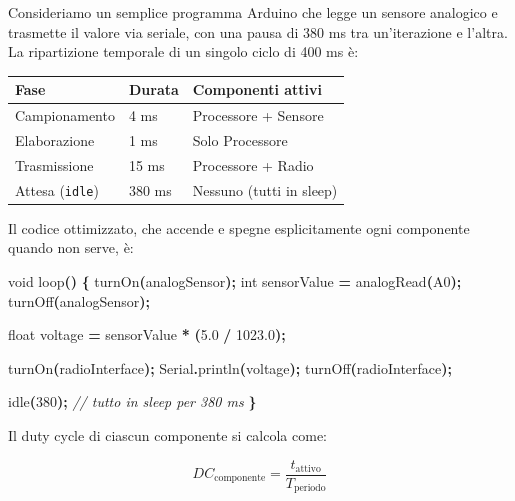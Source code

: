 \documentclass[
  italian,
  openany]{book}
\newenvironment{Shaded}{\begin{snugshade}}{\end{snugshade}}
\newcommand{\CommentTok}[1]{\textcolor[rgb]{0.56,0.35,0.01}{\textit{#1}}}
\newcommand{\DataTypeTok}[1]{\textcolor[rgb]{0.13,0.29,0.53}{#1}}
\newcommand{\DecValTok}[1]{\textcolor[rgb]{0.00,0.00,0.81}{#1}}
\newcommand{\FloatTok}[1]{\textcolor[rgb]{0.00,0.00,0.81}{#1}}
\newcommand{\NormalTok}[1]{#1}
\newcommand{\OperatorTok}[1]{\textcolor[rgb]{0.81,0.36,0.00}{\textbf{#1}}}
\newcounter{none} %
\begin{document}
Consideriamo un semplice programma Arduino che legge un sensore
analogico e trasmette il valore via seriale, con una pausa di 380 ms tra
un'iterazione e l'altra. La ripartizione temporale di un singolo ciclo
di 400 ms è:

{\def\LTcaptype{none} %
\begin{longtable}[]{@{}lll@{}}
\toprule\noalign{}
Fase & Durata & Componenti attivi \\
\midrule\noalign{}
\endhead
\bottomrule\noalign{}
\endlastfoot
Campionamento & 4 ms & Processore + Sensore \\
Elaborazione & 1 ms & Solo Processore \\
Trasmissione & 15 ms & Processore + Radio \\
Attesa (\texttt{idle}) & 380 ms & Nessuno (tutti in sleep) \\
\end{longtable}
}

Il codice ottimizzato, che accende e spegne esplicitamente ogni
componente quando non serve, è:

\begin{Shaded}
\begin{Highlighting}[]
\DataTypeTok{void}\NormalTok{ loop}\OperatorTok{()} \OperatorTok{\{}
\NormalTok{    turnOn}\OperatorTok{(}\NormalTok{analogSensor}\OperatorTok{);}
    \DataTypeTok{int}\NormalTok{ sensorValue }\OperatorTok{=}\NormalTok{ analogRead}\OperatorTok{(}\NormalTok{A0}\OperatorTok{);}
\NormalTok{    turnOff}\OperatorTok{(}\NormalTok{analogSensor}\OperatorTok{);}
    
    \DataTypeTok{float}\NormalTok{ voltage }\OperatorTok{=}\NormalTok{ sensorValue }\OperatorTok{*} \OperatorTok{(}\FloatTok{5.0} \OperatorTok{/} \FloatTok{1023.0}\OperatorTok{);}
    
\NormalTok{    turnOn}\OperatorTok{(}\NormalTok{radioInterface}\OperatorTok{);}
\NormalTok{    Serial}\OperatorTok{.}\NormalTok{println}\OperatorTok{(}\NormalTok{voltage}\OperatorTok{);}
\NormalTok{    turnOff}\OperatorTok{(}\NormalTok{radioInterface}\OperatorTok{);}
    
\NormalTok{    idle}\OperatorTok{(}\DecValTok{380}\OperatorTok{);}  \CommentTok{// tutto in sleep per 380 ms}
\OperatorTok{\}}
\end{Highlighting}
\end{Shaded}

Il duty cycle di ciascun componente si calcola come:

\[DC_\text{componente} = \frac{t_\text{attivo}}{T_\text{periodo}}\]
\end{document}
